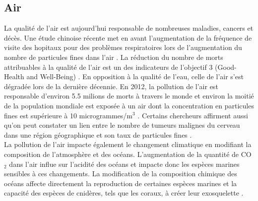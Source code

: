 \documentclass[10pt, article]{llncs}
\begin{document}
		\subsection{Air}
			La qualité de l'air est aujourd'hui responsable de nombreuses maladies, cancers et décès. Une étude chinoise récente met en avant l'augmentation de la fréquence de visite des hopitaux pour des problèmes respiratoires lors de l'augmentation du nombre de particules fines dans l'air \cite{liu_effects_2016}. La réduction du nombre de morts attribuables à la qualité de l'air est un des indicateurs de l'objectif 3 (Good-Health and Well-Being) \cite{united_nations_goal_nodate-5}. En opposition à la qualité de l'eau, celle de l'air s'est dégradée lors de la dernière décennie. En 2012, la pollution de l'air est responsable d'environ 5.5 milions de morts à travers le monde et environ la moitié de la population mondiale est exposée à un air dont la concentration en particules fines est supérieure à 10 microgrammes/m$^{3}$ \cite{yale_university_epi_2016}. Certains chercheurs affirment aussi qu'on peut constater un lien entre le nombre de tumeurs malignes du cerveau dans une région géographique et son taux de particules fines \cite{andersen_long-term_nodate}. \\
			La pollution de l'air impacte également le changement climatique en modifiant la composition de l'atmosphère et des océans. L'augmentation de la quantité de CO$_{2}$ dans l'air influe sur l'acidité des océans et impacte donc les espèces marines sensibles à ces changements. La modification de la composition chimique des océans affecte directement la reproduction de certaines espèces marines et la capacité des espèces de cnidères, tels que les coraux, à créer leur exosquelette \cite{hoegh-guldberg_coral_2007}.  \\		
		
\end{document}
